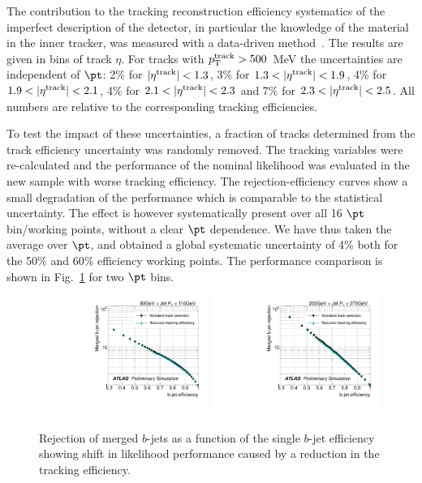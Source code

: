 The contribution to the tracking reconstruction efficiency systematics of the imperfect description of the detector, in particular the knowledge of the material in the inner tracker, was measured with a data-driven method~\cite{chargemultiplicity}.
The results are given in bins of track $\eta$. For tracks with $p_{\rm{T}}^{\rm{track}} > 500$~MeV the uncertainties are independent of $\pt$:  2\% for $|\eta^{\rm{track}}|<1.3$, 3\% for $1.3<|\eta^{\rm{track}}|<1.9$, 4\% for $1.9<|\eta^{\rm{track}}|<2.1$, 4\% for $2.1<|\eta^{\rm{track}}|<2.3$ and 7\% for $2.3<|\eta^{\rm{track}}|<2.5$. All numbers are relative to the corresponding tracking efficiencies.  

To test the impact of these uncertainties, a fraction of tracks determined from the track efficiency uncertainty was randomly removed.  %
The tracking variables were re-calculated and the performance of the nominal likelihood was evaluated in the new sample with worse tracking efficiency. The rejection-efficiency curves %
 show a small degradation of the performance which is comparable to the statistical uncertainty. The effect is however systematically present over all 16 $\pt$ bin/working points, without a clear $\pt$ dependence. We have thus taken the average over $\pt$, and obtained a global systematic uncertainty of 4\% both for the 50\% and 60\% efficiency working points. The performance comparison is shown in Fig.~\ref{fig:trackefficiency} for two $\pt$ bins. %

\begin{figure}[tp]
\centering
\includegraphics[width=0.49\textwidth]{FIGS/systematics/LlhoodKDE_ISO_TrackingUncertaintyTest_rejvseff080.pdf}
\includegraphics[width=0.49\textwidth]{FIGS/systematics/LlhoodKDE_ISO_TrackingUncertaintyTest_rejvseff200.pdf}
\caption{Rejection of merged $b$-jets as a function of the single $b$-jet efficiency showing shift in likelihood performance caused by a reduction in the tracking efficiency.}
\label{fig:trackefficiency}
\end{figure}

